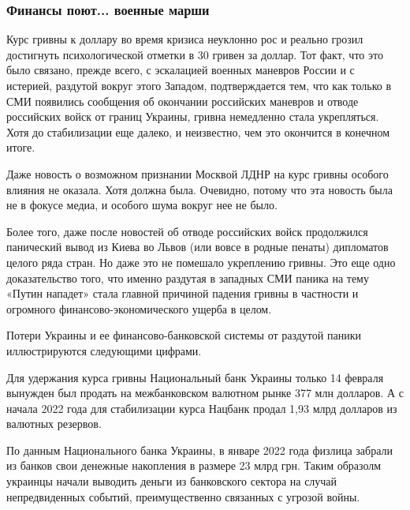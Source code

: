  
 
 
 
 

\subsubsection{Финансы поют... военные марши}

Курс гривны к доллару во время кризиса неуклонно рос и реально грозил
достигнуть психологической отметки в 30 гривен за доллар. Тот факт, что это
было связано, прежде всего, с эскалацией военных маневров России и с истерией,
раздутой вокруг этого Западом, подтверждается тем, что как только в СМИ
появились сообщения об окончании российских маневров и отводе российских войск
от границ Украины, гривна немедленно стала укрепляться. Хотя до стабилизации
еще далеко, и неизвестно, чем это окончится в конечном итоге.

Даже новость о возможном признании Москвой ЛДНР на курс гривны особого влияния
не оказала. Хотя должна была. Очевидно, потому что эта новость была не в фокусе
медиа, и особого шума вокруг нее не было.

Более того, даже после новостей об отводе российских войск продолжился
панический вывод из Киева во Львов (или вовсе в родные пенаты) дипломатов
целого ряда стран. Но даже это не помешало укреплению гривны. Это еще одно
доказательство того, что именно раздутая в западных СМИ паника на тему «Путин
нападет» стала главной причиной падения гривны в частности и огромного
финансово-экономического ущерба в целом.

Потери Украины и ее финансово-банковской системы от раздутой паники
иллюстрируются следующими цифрами.

Для удержания курса гривны Национальный банк Украины только 14 февраля вынужден
был продать на межбанковском валютном рынке 377 млн долларов. А с начала 2022
года для стабилизации курса Нацбанк продал 1,93 млрд долларов из валютных
резервов.

По данным Национального банка Украины, в январе 2022 года физлица забрали из
банков свои денежные накопления в размере 23 млрд грн. Таким образолм украинцы
начали выводить деньги из банковского сектора на случай непредвиденных событий,
преимущественно связанных с угрозой войны.

